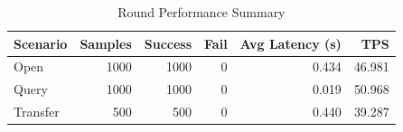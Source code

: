 \begin{table}
\caption{Round Performance Summary}
\label{tab:round_perf}
\begin{tabular}{lrrrrr}
\toprule
Scenario & Samples & Success & Fail & Avg Latency (s) & TPS \\
\midrule
Open & 1000 & 1000 & 0 & 0.434 & 46.981 \\
Query & 1000 & 1000 & 0 & 0.019 & 50.968 \\
Transfer & 500 & 500 & 0 & 0.440 & 39.287 \\
\bottomrule
\end{tabular}
\end{table}
